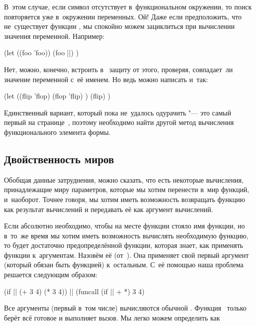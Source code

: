 В~этом случае, если символ отсутствует в~функциональном окружении, то поиск
повторяется уже в~окружении переменных. Ой! Даже если предположить, что
не~существует функции , мы спокойно можем зациклиться при вычислении
значения переменной. Например:

\begin{code:lisp}
(let ((foo 'foo))
  (foo ||) )
\end{code:lisp}

Нет, можно, конечно, встроить в~ защиту от этого,
проверяя, совпадает~ли значение переменной с~её именем. Но ведь можно написать
и~так:

\begin{code:lisp}
(let ((flip 'flop)
      (flop 'flip) )
  (flip) )
\end{code:lisp}

Единственный вариант, который пока не~удалось одурачить "--- это самый первый на
странице~\pageref{lisp1-2-omega/lisp2/src:erroneous-eval-application}, поэтому
необходимо найти другой метод вычисления функционального элемента формы.


\subsection{Двойственность миров}\label{lisp1-2-omega/lisp2/ssect:duality}

Обобщая данные затруднения, можно сказать, что есть некоторые вычисления,
принадлежащие миру параметров, которые мы хотим перенести в~мир функций,
и~наоборот. Точнее говоря, мы хотим иметь возможность возвращать функцию как
результат вычислений и передавать её как аргумент вычислений.

Если абсолютно необходимо, чтобы на месте функции стояло имя функции, но в~то~же
время мы хотим иметь возможность вычислять необходимую функцию, то будет
достаточно предопределённой функции, которая знает, как применять функции
к~аргументам. Назовём её  (от~). Она применяет
свой первый аргумент (который обязан быть функцией) к~остальным. С~её помощью
наша проблема решается следующим образом:

\begin{code:lisp}
(if || (+ 3 4) (* 3 4)) |\eq| (funcall (if || + *) 3 4)
\end{code:lisp}

Все аргументы (первый в~том числе) вычисляются обычной .
Функция~ только берёт всё готовое и выполняет вызов. Мы легко можем
определить  как

